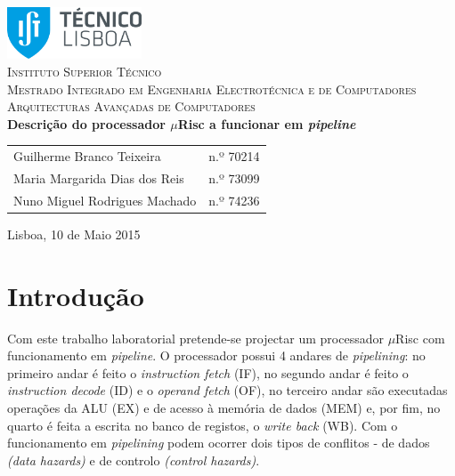 \documentclass[11pt]{article}
\numberwithin{equation}{section}
\begin{document}
\begin{titlepage}
\begin{center}

\hfill \break
\hfill \break

\includegraphics[width=0.3\textwidth]{./logo}~\\[1cm]

\textsc{\LARGE Instituto Superior Técnico}\\[0.25cm]
\textsc{\Large Mestrado Integrado em Engenharia Electrotécnica e de Computadores}\\[1.8cm]
\textsc{\huge Arquitecturas Avançadas de Computadores}\\[0.25cm]

{\huge \bfseries Descrição do processador $\mu$Risc a funcionar em \textit{pipeline}\\[1.2cm]}

\begin{tabular}{ l l }
Guilherme Branco Teixeira & \hspace{2mm} n.º 70214 \\ 
Maria Margarida Dias dos Reis & \hspace{2mm} n.º 73099 \\
Nuno Miguel Rodrigues Machado & \hspace{2mm} n.º 74236 
\end{tabular}

\vfill

{\large Lisboa, 10 de Maio 2015} 

\end{center}
\end{titlepage}
 
\clearpage

\tableofcontents
\pagebreak

\clearpage
{}

\section{Introdução}

Com este trabalho laboratorial pretende-se projectar um processador $\mu$Risc com funcionamento em \textit{pipeline}. O processador possui 4 andares de \textit{pipelining}: no primeiro andar é feito o \textit{instruction fetch} (IF), no segundo andar é feito o \textit{instruction decode} (ID) e o \textit{operand fetch} (OF), no terceiro andar são executadas operações da ALU (EX) e de acesso à memória de dados (MEM) e, por fim, no quarto é feita a escrita no banco de registos, o \textit{write back }(WB). Com o funcionamento em \textit{pipelining} podem ocorrer dois tipos de conflitos - de dados \textit{(data hazards)} e de controlo \textit{(control hazards)}. 
\end{document}
